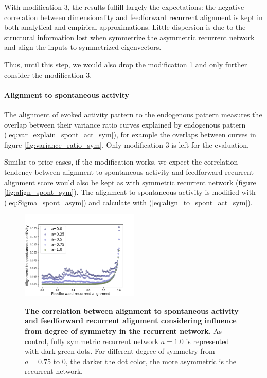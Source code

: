 \documentclass[11pt]{article}
\begin{document}
	With modification 3, the results fulfill largely the expectations: the negative correlation between dimensionality and feedforward recurrent alignment is kept in both analytical and empirical approximations. Little dispersion is due to the structural information lost when symmetrize the asymmetric recurrent network and align the inputs to symmetrized eigenvectors. 
	
	Thus, until this step, we would also drop the modification 1 and only further consider the modification 3. 
	
	\paragraph{Alignment to spontaneous activity}
	The alignment of evoked activity pattern to the endogenous pattern measures the overlap between their variance ratio curves explained by endogenous pattern (\ref{eq:var_explain_spont_act_sym}), for example the overlaps between curves in figure \ref{fig:variance_ratio_sym}. Only modification 3 is left for the evaluation. 
	
	Similar to prior cases, if the modification works, we expect the correlation tendency between alignment to spontaneous activity and feedforward recurrent alignment score would also be kept as with symmetric recurrent network (figure \ref{fig:align_spont_sym}). The alignment to spontaneous activity is modified with (\ref{eq:Sigma_spont_asym}) and calculate with (\ref{eq:align_to_spont_act_sym}). 
		\vspace{-0.5cm}
		\begin{figure} 
			\centering
			\caption{\textbf{The correlation between alignment to spontaneous activity and feedforward recurrent alignment considering influence from degree of symmetry in the recurrent network.} As control, fully symmetric recurrent network $a=1.0$ is represented with dark green dots. For different degree of symmetry from $a = 0.75$ to $0$, the darker the dot color, the more asymmetric is the recurrent network. }
			\includegraphics[width=0.5\textwidth]{../figures/align_to_spont_asym_symmetrized_rescaled.png}
			\label{fig:align_to_spont_asym}
		\end{figure}
	
\end{document}
